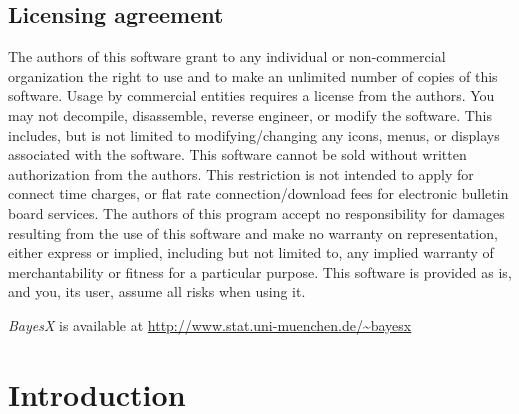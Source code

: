 \documentclass[11pt,a4paper,twoside]{bayesxarticle}
\begin{document}
\subsection*{Licensing agreement} The authors of this software grant
to any individual or non-commercial organization the right to use
and to make an unlimited number of copies of this software. Usage by
commercial entities requires a license from the authors. You may not
decompile, disassemble, reverse engineer, or modify the software.
This includes, but is not limited to modifying/changing any icons,
menus, or displays associated with the software. This software
cannot be sold without written authorization from the authors. This
restriction is not intended to apply for connect time charges, or
flat rate connection/download fees for electronic bulletin board
services. The authors of this program accept no responsibility for
damages resulting from the use of this software and make no warranty
on representation, either express or implied, including but not
limited to, any implied warranty of merchantability or fitness for a
particular purpose. This software is provided as is, and you, its
user, assume all risks when using it.

\vspace{0.5cm}

{\em BayesX} is available at {
\href{http://www.stat.uni-muenchen.de/~bayesx}{http://www.stat.uni-muenchen.de/\~{}bayesx}}

\newpage

\section{Introduction}
\end{document}
